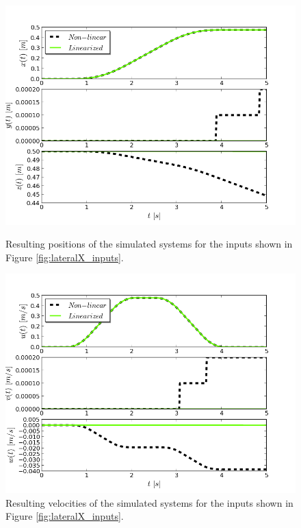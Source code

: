 \begin{figure}[h!]
\centering
\includegraphics[scale=0.7]{Images/Chapter3/Lateral_X/Positions.png}
\caption{Resulting positions of the simulated systems for the inputs shown in Figure \ref{fig:lateralX_inputs}.}
\label{fig:LateralX_positions}

\includegraphics[scale=0.7]{Images/Chapter3/Lateral_X/Linear_velocities.png}
\caption{Resulting velocities of the simulated systems for the inputs shown in Figure \ref{fig:lateralX_inputs}.}
\label{fig:LateralX_velocities}
\end{figure}

